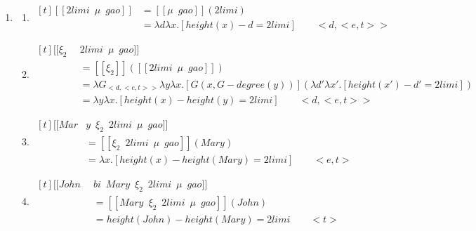 \documentclass{ctexart}
\begin{document}
\begin{enumerate}
    \item \label{maomao18}
    \begin{enumerate}
        \item \label{maomao18_b}
        $\begin{aligned}[t]
            [\![2limi \enspace \mu \enspace gao]\!] &= [\![\mu \enspace gao]\!](2limi) \\
            &= \lambda d \lambda x. [height(x) - d = 2 limi] \qquad <d,<e,t>>
        \end{aligned}$

        \item \label{maomao18_c}
        $\begin{aligned}[t]
            [\![\xi_2 \enspace & 2limi \enspace \mu \enspace gao]\!] \\
            &= [\![\xi_2]\!]([\![2limi \enspace \mu \enspace gao]\!]) \\
            &= \lambda G_{<d,<e,t>>} \lambda y \lambda x. [G(x,G-degree(y))](\lambda d' \lambda x'. [height(x') - d' = 2 limi])\\
            &= \lambda y \lambda x. [height(x) - height(y) = 2 limi] \qquad <d,<e,t>>
        \end{aligned}$

        \item \label{maomao18_d}
        $\begin{aligned}[t]
            [\![Mar&y \enspace \xi_2 \enspace 2limi \enspace \mu \enspace gao]\!] \\
            &= [\![\xi_2 \enspace 2limi \enspace \mu \enspace gao]\!](Mary) \\
            &=\lambda x.[height(x) - height(Mary)=2limi] \qquad <e,t>
        \end{aligned}$

        \item \label{maomao18_e}
        $\begin{aligned}[t]
            [\![John \enspace &bi \enspace Mary \enspace \xi_2 \enspace 2limi \enspace \mu \enspace gao]\!] \\
            &= [\![Mary \enspace \xi_2 \enspace 2limi \enspace \mu \enspace gao]\!](John) \\
            &=height(John) - height(Mary) = 2limi \qquad <t>
        \end{aligned}$

    \end{enumerate}
\end{enumerate}
\end{document}
